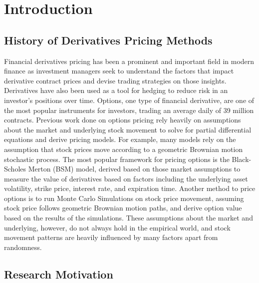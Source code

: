 \chapter{Introduction}

\section{History of Derivatives Pricing Methods}

Financial derivatives pricing has been a prominent and important field in modern finance as investment managers seek to understand the factors that impact derivative contract prices and devise trading strategies on those insights. Derivatives have also been used as a tool for hedging to reduce risk in an investor's positions over time. Options, one type of financial derivative, are one of the most popular instruments for investors, trading an average daily of 39 million contracts. Previous work done on options pricing rely heavily on assumptions about the market and underlying stock movement to solve for partial differential equations and derive pricing models. For example, many models rely on the assumption that stock prices move according to a geometric Brownian motion stochastic process. The most popular framework for pricing options is the Black-Scholes Merton (BSM) model, derived based on those market assumptions to measure the value of derivatives based on factors including the underlying asset volatility, strike price, interest rate, and expiration time. Another method to price options is to run Monte Carlo Simulations on stock price movement, assuming stock price follows geometric Brownian motion paths, and derive option value based on the results of the simulations. These assumptions about the market and underlying, however, do not always hold in the empirical world, and stock movement patterns are heavily influenced by many factors apart from randomness.

\section{Research Motivation}

